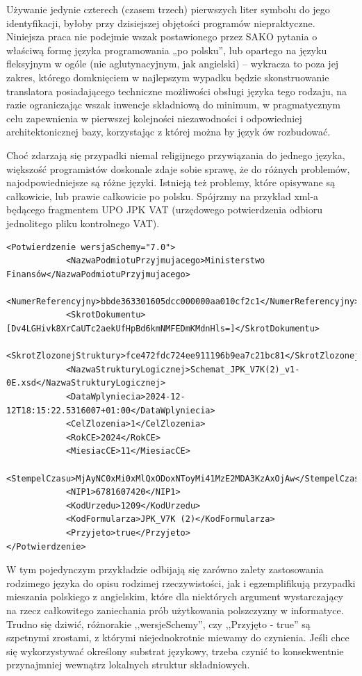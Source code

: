 Używanie jedynie czterech (czasem trzech) pierwszych liter symbolu do jego identyfikacji, byłoby przy dzisiejszej objętości programów niepraktyczne. Niniejsza praca nie podejmie wszak postawionego przez SAKO pytania o właściwą formę języka programowania „po polsku”, lub opartego na języku fleksyjnym w ogóle (nie aglutynacyjnym, jak angielski) – wykracza to poza jej zakres, którego domknięciem w najlepszym wypadku będzie skonstruowanie translatora posiadającego techniczne możliwości obsługi języka tego rodzaju, na razie ograniczając wszak inwencje składniową do minimum, w pragmatycznym celu zapewnienia w pierwszej kolejności niezawodności i odpowiedniej architektonicznej bazy, korzystając z której można by język ów rozbudować.

Choć zdarzają się przypadki niemal religijnego przywiązania do jednego języka, większość programistów doskonale zdaje sobie sprawę, że do różnych problemów, najodpowiedniejsze są różne języki. Istnieją też problemy, które opisywane są całkowicie, lub prawie całkowicie po polsku. Spójrzmy na przykład xml-a będącego fragmentem UPO JPK VAT (urzędowego potwierdzenia odbioru jednolitego pliku kontrolnego VAT).
\begin{lstlisting}
<Potwierdzenie wersjaSchemy="7.0">
            <NazwaPodmiotuPrzyjmujacego>Ministerstwo Finansów</NazwaPodmiotuPrzyjmujacego>
            <NumerReferencyjny>bbde363301605dcc000000aa010cf2c1</NumerReferencyjny>
            <SkrotDokumentu>[Dv4LGHivk8XrCaUTc2aekUfHpBd6kmNMFEDmKMdnHls=]</SkrotDokumentu>
            <SkrotZlozonejStruktury>fce472fdc724ee911196b9ea7c21bc81</SkrotZlozonejStruktury>
            <NazwaStrukturyLogicznej>Schemat_JPK_V7K(2)_v1-0E.xsd</NazwaStrukturyLogicznej>
            <DataWplyniecia>2024-12-12T18:15:22.5316007+01:00</DataWplyniecia>
            <CelZlozenia>1</CelZlozenia>
            <RokCE>2024</RokCE>
            <MiesiacCE>11</MiesiacCE>
            <StempelCzasu>MjAyNC0xMi0xMlQxODoxNToyMi41MzE2MDA3KzAxOjAw</StempelCzasu>
            <NIP1>6781607420</NIP1>
            <KodUrzedu>1209</KodUrzedu>
            <KodFormularza>JPK_V7K (2)</KodFormularza>
            <Przyjeto>true</Przyjeto>
</Potwierdzenie>
\end{lstlisting}
W tym pojedynczym przykładzie odbijają się zarówno zalety zastosowania rodzimego języka do opisu rodzimej rzeczywistości, jak i egzemplifikują przypadki mieszania polskiego z angielskim, które dla niektórych argument wystarczający na rzecz całkowitego zaniechania prób użytkowania polszczyzny w informatyce. Trudno się dziwić, różnorakie ,,wersjeSchemy'', czy ,,Przyjęto - true'' są szpetnymi zrostami, z którymi niejednokrotnie miewamy do czynienia. Jeśli chce się wykorzystywać określony substrat językowy, trzeba czynić to konsekwentnie przynajmniej wewnątrz lokalnych struktur składniowych.

